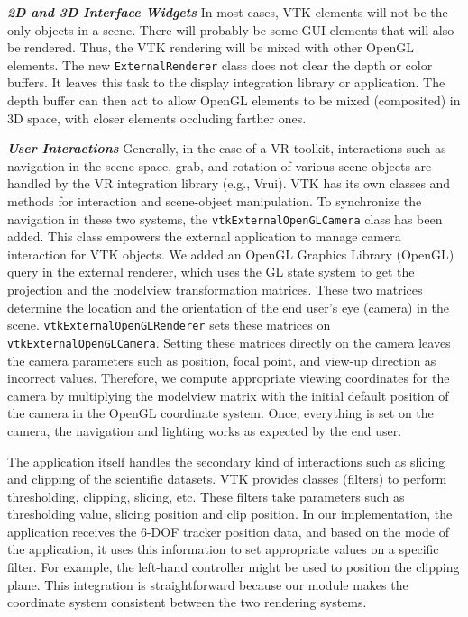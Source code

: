 \textbf{\textit{2D and 3D Interface Widgets}} In most cases, VTK elements will not be the only objects in a scene.
There will probably be some GUI elements that will also be rendered.
Thus, the VTK rendering will be mixed with other OpenGL elements.
The new \texttt{ExternalRenderer} class does not clear the depth or color buffers. It leaves this task to the display integration library or application.
The depth buffer can then act to allow OpenGL elements to be mixed (composited)
in 3D space, with closer elements occluding farther ones.

\textbf{\textit{User Interactions}} Generally, in the case of a VR toolkit, interactions such as navigation in the scene space, grab, and rotation of various scene objects are handled by the VR integration library (e.g., Vrui).
VTK has its own classes and methods for interaction and scene-object manipulation.
To synchronize the navigation in these two systems, the \texttt{vtkExternalOpenGLCamera} class has been added.
This class empowers the external application to manage camera interaction for VTK objects.
We added an OpenGL Graphics Library (OpenGL) query in the external renderer, which uses the GL state system to get the projection and the modelview transformation matrices.
These two matrices determine the location and the orientation of the end user's eye
(camera) in the scene.
\texttt{vtkExternalOpenGLRenderer} sets these matrices on \texttt{vtkExternalOpenGLCamera}.
Setting these matrices directly on the camera leaves the camera parameters such as position, focal point, and view-up direction as incorrect values. Therefore, we compute appropriate viewing coordinates for the camera by multiplying the modelview matrix with the initial default position of the camera in the OpenGL coordinate system. 
Once, everything is set on the camera, the navigation and lighting works as expected by the end user.

The application itself handles the secondary kind of interactions such as slicing and clipping of the scientific datasets.
VTK provides classes (filters) to perform thresholding, clipping, slicing, etc.
These filters take parameters such as thresholding value, slicing position and clip position. 
In our implementation, the application receives the 6-DOF tracker position data, and based on the mode of the application, it uses this information to set appropriate values on a specific filter.
For example, the left-hand controller might be used to position the clipping plane.
This integration is straightforward because our module makes the coordinate system consistent between the two rendering systems.

